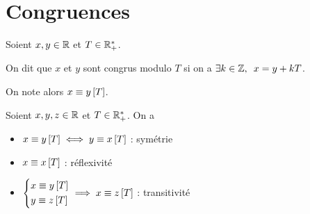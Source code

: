 \section{Congruences}

\begin{defi}
Soient \(x,y\in\mathbb{R}\) et \(T\in\mathbb{R}_+^*\).

On dit que \(x\) et \(y\) sont congrus modulo \(T\) si on a \(\quantifs{\exists k\in\Z}x=y+kT\).

On note alors \(x\equiv y\left[T\right]\).
\end{defi}

\begin{rem}
Soient \(x,y,z\in\mathbb{R}\) et \(T\in\mathbb{R}_+^*\). On a \begin{itemize}
\item \(x\equiv y\left[T\right]\iff y\equiv x\left[T\right]\) : symétrie

\item \(x\equiv x\left[T\right]\) : réflexivité

\item \(\begin{dcases}x\equiv y\left[T\right] \\ y\equiv z\left[T\right]\end{dcases}\implies x\equiv z\left[T\right]\) : transitivité
\end{itemize}
\end{rem}